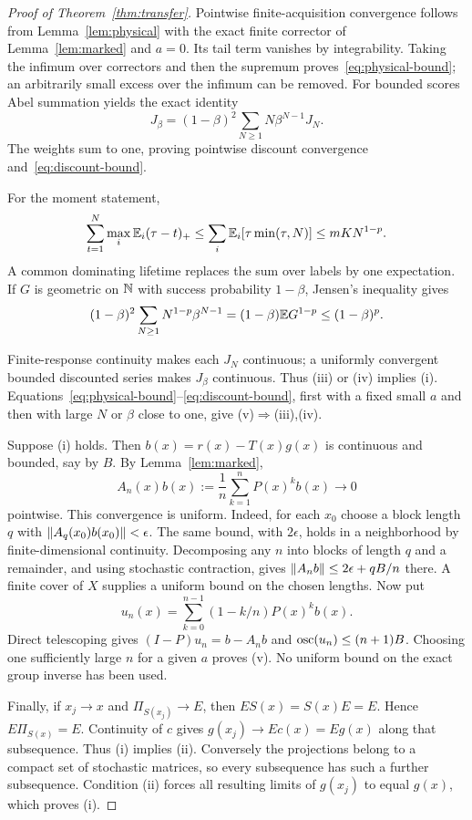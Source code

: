 \begin{proof}[Proof of Theorem~\ref{thm:transfer}]
Pointwise finite-acquisition convergence follows from Lemma~\ref{lem:physical} with the exact finite corrector of Lemma~\ref{lem:marked} and $a=0$. Its tail term vanishes by integrability. Taking the infimum over correctors and then the supremum proves~\eqref{eq:physical-bound}; an arbitrarily small excess over the infimum can be removed. For bounded scores Abel summation yields the exact identity
\begin{equation}\label{eq:abel}
 J_\beta=(1-\beta)^2\sum_{N\ge1}N\beta^{N-1}J_N.
\end{equation}
The weights sum to one, proving pointwise discount convergence and~\eqref{eq:discount-bound}.

For the moment statement,
\[
 \sum_{t=1}^N\max_i\mathbb E_i(\tau-t)_+
 \le\sum_i\mathbb E_i[\tau\min(\tau,N)]\le mK N^{1-p}.
\]
A common dominating lifetime replaces the sum over labels by one expectation. If $G$ is geometric on $\mathbb N$ with success probability $1-\beta$, Jensen's inequality gives
\[
 (1-\beta)^2\sum_{N\ge1}N^{1-p}\beta^{N-1}
 =(1-\beta)\mathbb E G^{1-p}\le(1-\beta)^p.
\]

Finite-response continuity makes each $J_N$ continuous; a uniformly convergent bounded discounted series makes $J_\beta$ continuous. Thus (iii) or (iv) implies (i). Equations~\eqref{eq:physical-bound}--\eqref{eq:discount-bound}, first with a fixed small $a$ and then with large $N$ or $\beta$ close to one, give (v)$\Rightarrow$(iii),(iv).

Suppose (i) holds. Then $b(x)=r(x)-T(x)g(x)$ is continuous and bounded, say by $B$. By Lemma~\ref{lem:marked},
\[
 A_n(x)b(x):=\frac1n\sum_{k=1}^nP(x)^k b(x)\longrightarrow0
\]
pointwise. This convergence is uniform. Indeed, for each $x_0$ choose a block length $q$ with $\left\lVert A_q(x_0)b(x_0)\right\rVert<\epsilon$. The same bound, with $2\epsilon$, holds in a neighborhood by finite-dimensional continuity. Decomposing any $n$ into blocks of length $q$ and a remainder, and using stochastic contraction, gives $\left\lVert A_n b\right\rVert\le2\epsilon+qB/n$ there. A finite cover of $X$ supplies a uniform bound on the chosen lengths. Now put
\[
 u_n(x)=\sum_{k=0}^{n-1}(1-k/n)P(x)^k b(x).
\]
Direct telescoping gives $(I-P)u_n=b-A_n b$ and $\operatorname{osc}(u_n)\le(n+1)B$. Choosing one sufficiently large $n$ for a given $a$ proves (v). No uniform bound on the exact group inverse has been used.

Finally, if $x_j\to x$ and $\Pi_{S(x_j)}\to E$, then $ES(x)=S(x)E=E$. Hence $E\Pi_{S(x)}=E$. Continuity of $c$ gives $g(x_j)\to Ec(x)=Eg(x)$ along that subsequence. Thus (i) implies (ii). Conversely the projections belong to a compact set of stochastic matrices, so every subsequence has such a further subsequence. Condition (ii) forces all resulting limits of $g(x_j)$ to equal $g(x)$, which proves (i).
\end{proof}

